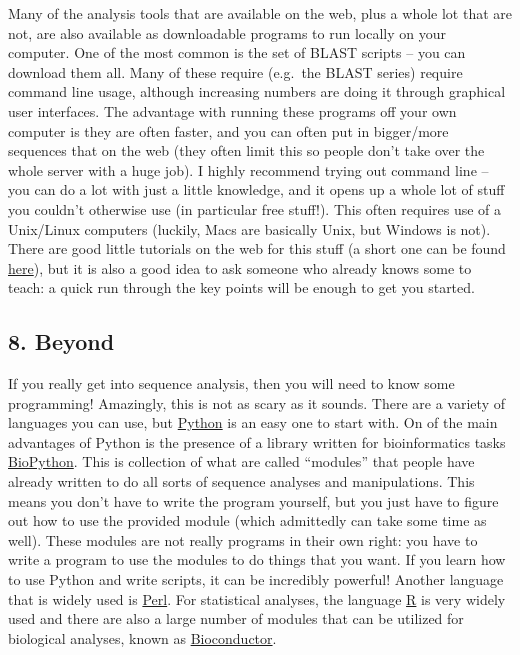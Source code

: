 \documentclass[]{article}
\begin{document}
Many of the analysis tools that are available on the web, plus a whole
lot that are not, are also available as downloadable programs to run
locally on your computer. One of the most common is the set of BLAST
scripts -- you can download them all. Many of these require (e.g.~the
BLAST series) require command line usage, although increasing numbers
are doing it through graphical user interfaces. The advantage with
running these programs off your own computer is they are often faster,
and you can often put in bigger/more sequences that on the web (they
often limit this so people don't take over the whole server with a huge
job). I highly recommend trying out command line -- you can do a lot
with just a little knowledge, and it opens up a whole lot of stuff you
couldn't otherwise use (in particular free stuff!). This often requires
use of a Unix/Linux computers (luckily, Macs are basically Unix, but
Windows is not). There are good little tutorials on the web for this
stuff (a short one can be found
\href{http://compbio.massey.ac.nz/wiki/\#!comp_unix.md}{here}), but it
is also a good idea to ask someone who already knows some to teach: a
quick run through the key points will be enough to get you started.

\subsection{8. Beyond}\label{beyond}

If you really get into sequence analysis, then you will need to know
some programming! Amazingly, this is not as scary as it sounds. There
are a variety of languages you can use, but
\href{https://www.python.org/}{Python} is an easy one to start with. On
of the main advantages of Python is the presence of a library written
for bioinformatics tasks \href{http://www.biopython.org/}{BioPython}.
This is collection of what are called ``modules'' that people have
already written to do all sorts of sequence analyses and manipulations.
This means you don't have to write the program yourself, but you just
have to figure out how to use the provided module (which admittedly can
take some time as well). These modules are not really programs in their
own right: you have to write a program to use the modules to do things
that you want. If you learn how to use Python and write scripts, it can
be incredibly powerful! Another language that is widely used is
\href{http://www.perl.org/}{Perl}. For statistical analyses, the
language \href{http://www.r-project.org/}{R} is very widely used and
there are also a large number of modules that can be utilized for
biological analyses, known as
\href{http://www.bioconductor.org/}{Bioconductor}.
\end{document}
